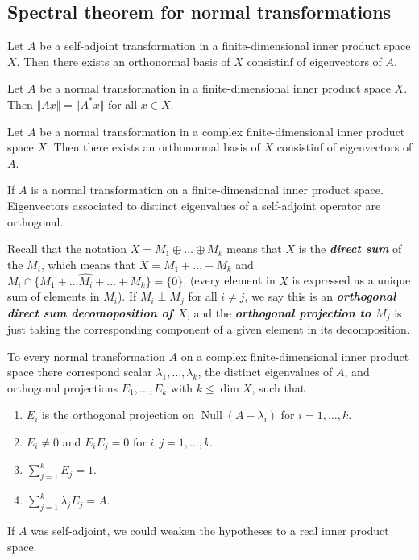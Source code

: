 \documentclass{article}
\theoremstyle{definition}
\numberwithin{equation}{section}
\begin{document}
	\subsection{Spectral theorem for normal transformations}
	\begin{thm}
		Let $A$ be a self-adjoint transformation in a finite-dimensional inner product space $X$. Then there exists an orthonormal basis of $X$ consistinf of eigenvectors of $A$.
	\end{thm}
	\begin{lemma}
		Let $A$ be a normal transformation in a finite-dimensional inner product space $X$. Then $\Vert Ax\Vert=\Vert A^*x\Vert$ for all $x\in X$.
	\end{lemma}
	\begin{thm}
		Let $A$ be a normal transformation in a complex finite-dimensional inner product space $X$. Then there exists an orthonormal basis of $X$ consistinf of eigenvectors of $A$.
	\end{thm}
	\begin{thm}
		If $A$ is a normal transformation on a finite-dimensional inner product space. Eigenvectors associated to distinct eigenvalues of a self-adjoint operator are orthogonal.
	\end{thm}
	Recall that the notation $X=M_1\oplus\ldots\oplus M_k$ means that $X$ is the \textbf{\textit{direct sum}} of the $M_i$, which means that $X=M_1+\ldots+M_k$ and $M_i\cap\{M_1+\ldots \hat{M_i}+\ldots+M_k\}=\{0\}$, (every element in $X$ is expressed as a unique sum of elements in $M_i$). If $M_i\perp M_j$ for all $i\neq j$, we say this is an \textbf{\textit{orthogonal direct sum decomoposition of $X$}}, and the \textbf{\textit{orthogonal projection to $M_j$}} is just taking the corresponding component of a given element in its decomposition.
	\begin{thm}
		To every normal transformation $A$ on a complex finite-dimensional inner product space there correspond scalar $\lambda_1,\ldots,\lambda_k$, the distinct eigenvalues of $A$, and orthogonal projections $E_1,\ldots,E_k$ with $k\leq \dim X$, such that
		\begin{enumerate}
			\item $E_i$ is the orthogonal projection on $\operatorname{Null}(A-\lambda_i)$ for $i=1,\ldots,k$.
			\item $E_i\neq0$ and $E_iE_j=0$ for $i,j=1,\ldots,k$.
			\item $\sum_{j=1}^kE_j=1$.
			\item $\sum_{j=1}^k\lambda_jE_j=A$.
		\end{enumerate}
	\end{thm}
	If $A$ was self-adjoint, we could weaken the hypotheses to a real inner product space.
\end{document}
